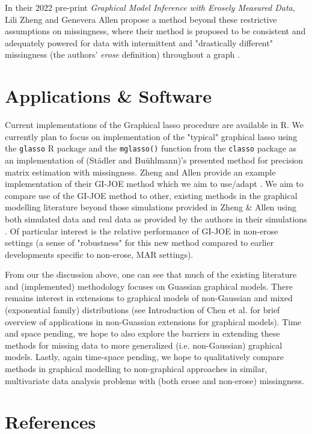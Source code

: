 \documentclass[11pt,twoside]{article}
\begin{document}
In their 2022 pre-print {\it Graphical Model Inference with Erosely Measured Data}, Lili Zheng and Genevera Allen propose a method beyond these restrictive assumptions on missingness, where their method is proposed to be consistent and adequately powered for data with intermittent and "drastically different" missingness (the authors' {\it erose} definition) throughout a graph \cite{zheng_graphical_2023}.


\section{Applications \& Software}

Current implementations of the Graphical lasso procedure are available in R. We currently plan to focus on implementation of the "typical" graphical lasso using the \texttt{glasso} R package \cite{friedman_glasso_2019} and the \texttt{mglasso()} function from the \texttt{classo} package \cite{augugliaro_cglasso_2023} as an implementation of (St\"adler and Bu\"uhlmann)'s presented method for precision matrix estimation with missingness. Zheng and Allen provide an example implementation of their GI-JOE method which we aim to use/adapt \cite{zheng_gi-joe_2023}. We aim to compare use of the GI-JOE method to other, existing methods in the graphical modelling literature beyond those simulations provided in Zheng \& Allen \cite{zheng_graphical_2023} using both simulated data and real data as provided by the authors in their simulations \cite{zheng_gi-joe_2023}. Of particular interest is the relative performance of GI-JOE in non-erose settings (a sense of "robustness" for this new method compared to earlier developments specific to non-erose, MAR settings). 

From our the discussion above, one can see that much of the existing literature and (implemented) methodology focuses on Guassian graphical models. There remains interest in extensions to graphical models of non-Gaussian and mixed (exponential family) distributions (see Introduction of Chen et al. for brief overview of applications in non-Guassian extensions for graphical models)\cite{chen_selection_2015}.
Time and space pending, we hope to also explore the barriers in extending these methods for missing data to more generalized (i.e. non-Gaussian) graphical models. Lastly, again time-space pending, we hope to qualitatively compare methods in graphical modelling to non-graphical approaches in similar, multivariate data analysis problems with (both erose and non-erose) missingness. 

 
\section{References}

\printbibliography 
\end{document}
